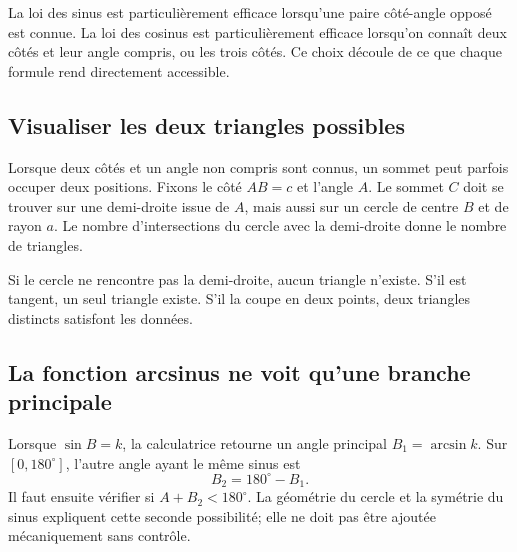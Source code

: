 \documentclass[12pt,a4paper,openany]{book}
\begin{document}
\begin{connectionbox}
La loi des sinus est particulièrement efficace lorsqu'une paire côté-angle opposé est connue. La loi des cosinus est particulièrement efficace lorsqu'on connaît deux côtés et leur angle compris, ou les trois côtés. Ce choix découle de ce que chaque formule rend directement accessible.
\end{connectionbox}



\subsection{Visualiser les deux triangles possibles}
Lorsque deux côtés et un angle non compris sont connus, un sommet peut parfois occuper deux positions. Fixons le côté $AB=c$ et l'angle $A$. Le sommet $C$ doit se trouver sur une demi-droite issue de $A$, mais aussi sur un cercle de centre $B$ et de rayon $a$. Le nombre d'intersections du cercle avec la demi-droite donne le nombre de triangles.

\begin{center}
\end{center}

Si le cercle ne rencontre pas la demi-droite, aucun triangle n'existe. S'il est tangent, un seul triangle existe. S'il la coupe en deux points, deux triangles distincts satisfont les données.

\subsection{La fonction arcsinus ne voit qu'une branche principale}
Lorsque $\sin B=k$, la calculatrice retourne un angle principal $B_1=\arcsin k$. Sur $[0,180^\circ]$, l'autre angle ayant le même sinus est
\[
B_2=180^\circ-B_1.
\]
Il faut ensuite vérifier si $A+B_2<180^\circ$. La géométrie du cercle et la symétrie du sinus expliquent cette seconde possibilité; elle ne doit pas être ajoutée mécaniquement sans contrôle.
\end{document}
